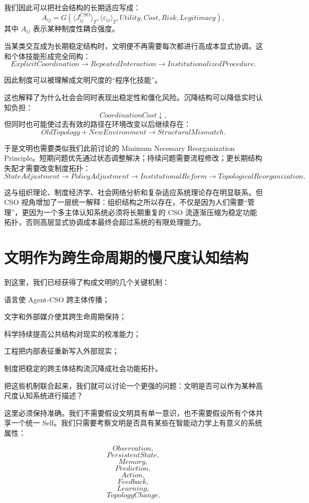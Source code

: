 我们因此可以把社会结构的长期适应写成：
\[
\dot{A}_{ij}
=
G(
\langle J_{ij}^{CSO}\rangle_T,
\langle \varepsilon_{ij}\rangle_T,
Utility,
Cost,
Risk,
Legitimacy
),
\]
其中 $A_{ij}$ 表示某种制度性耦合强度。

当某类交互成为长期稳定结构时，文明便不再需要每次都进行高成本显式协调。这和个体技能形成完全同构：
\[
ExplicitCoordination
\rightarrow
RepeatedInteraction
\rightarrow
InstitutionalizedProcedure.
\]

因此制度可以被理解成文明尺度的“程序化技能”。

这也解释了为什么社会会同时表现出稳定性和僵化风险。沉降结构可以降低实时认知负担：
\[
CoordinationCost\downarrow,
\]
但同时也可能使过去有效的路径在环境改变以后继续存在：
\[
OldTopology
+
NewEnvironment
\rightarrow
StructuralMismatch.
\]

于是文明也需要类似我们此前讨论的 Minimum Necessary Reorganization Principle。短期问题优先通过状态调整解决；持续问题需要流程修改；更长期结构失配才需要改变制度拓扑：
\[
StateAdjustment
\rightarrow
PolicyAdjustment
\rightarrow
InstitutionalReform
\rightarrow
TopologicalReorganization.
\]

这与组织理论、制度经济学、社会网络分析和复杂适应系统理论存在明显联系。但 CSO 视角增加了一层统一解释：组织结构之所以存在，不仅是因为人们需要“管理”，更因为一个多主体认知系统必须将长期重复的 CSO 流逐渐压缩为稳定功能拓扑，否则高层显式协调成本最终会超过系统的有限处理能力。


\section{文明作为跨生命周期的慢尺度认知结构}

到这里，我们已经获得了构成文明的几个关键机制：

语言使 Agent-CSO 跨主体传播；

文字和外部媒介使其跨生命周期保持；

科学持续提高公共结构对现实的校准能力；

工程把内部表征重新写入外部现实；

制度把稳定的跨主体结构流沉降成社会功能拓扑。

把这些机制联合起来，我们就可以讨论一个更强的问题：文明是否可以作为某种高尺度认知系统进行描述？

这里必须保持准确。我们不需要假设文明具有单一意识，也不需要假设所有个体共享一个统一 Self。我们只需要考察文明是否具有某些在智能动力学上有意义的系统属性：

\[
Observation,
\]
\[
PersistentState,
\]
\[
Memory,
\]
\[
Prediction,
\]
\[
Action,
\]
\[
Feedback,
\]
\[
Learning,
\]
\[
TopologyChange.
\]

